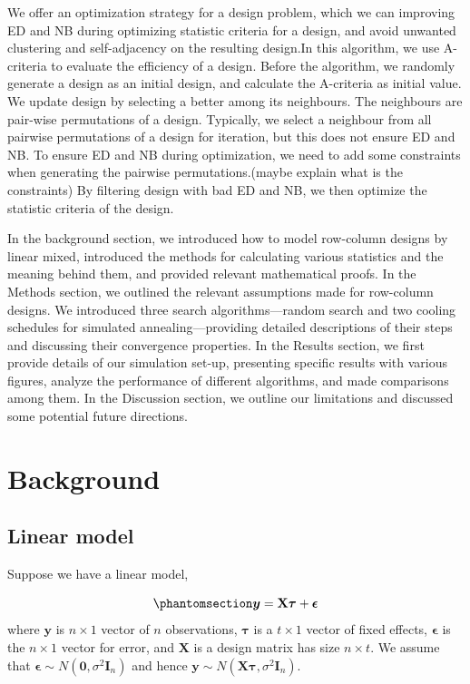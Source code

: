 \documentclass[
  a4paper,
  oneside,
  openany,
  12pt,
  onecolumn]{book}
\theoremstyle{definition}
\theoremstyle{plain}
\theoremstyle{remark}
\begin{document}
We offer an optimization strategy for a design problem, which we can
improving ED and NB during optimizing statistic criteria for a design,
and avoid unwanted clustering and self-adjacency on the resulting
design.In this algorithm, we use A-criteria to evaluate the efficiency
of a design. Before the algorithm, we randomly generate a design as an
initial design, and calculate the A-criteria as initial value. We update
design by selecting a better among its neighbours. The neighbours are
pair-wise permutations of a design. Typically, we select a neighbour
from all pairwise permutations of a design for iteration, but this does
not ensure ED and NB. To ensure ED and NB during optimization, we need
to add some constraints when generating the pairwise permutations.(maybe
explain what is the constraints) By filtering design with bad ED and NB,
we then optimize the statistic criteria of the design.

In the background section, we introduced how to model row-column designs
by linear mixed, introduced the methods for calculating various
statistics and the meaning behind them, and provided relevant
mathematical proofs. In the Methods section, we outlined the relevant
assumptions made for row-column designs. We introduced three search
algorithms---random search and two cooling schedules for simulated
annealing---providing detailed descriptions of their steps and
discussing their convergence properties. In the Results section, we
first provide details of our simulation set-up, presenting specific
results with various figures, analyze the performance of different
algorithms, and made comparisons among them. In the Discussion section,
we outline our limitations and discussed some potential future
directions.


\chapter{Background}\label{sec-bg}

\section{Linear model}\label{linear-model}

Suppose we have a linear model,

\begin{equation}\phantomsection\label{eq-lm}{\boldsymbol{y}=\mathbf{X}\boldsymbol{\tau} + \boldsymbol{\epsilon}}\end{equation}
where \(\boldsymbol{y}\) is \(n\times 1\) vector of \(n\) observations,
\(\boldsymbol{\tau}\) is a \(t\times 1\) vector of fixed effects,
\(\boldsymbol{\epsilon}\) is the \(n\times 1\) vector for error, and
\(\mathbf{X}\) is a design matrix has size \(n\times t\). We assume that
\(\boldsymbol{\epsilon} \sim N(\boldsymbol{0}, \sigma^2\boldsymbol{I}_{n})\)
and hence
\(\boldsymbol{y} \sim N(\mathbf{X}\boldsymbol{\tau}, \sigma^2\mathbf{I}_n)\).
\end{document}

